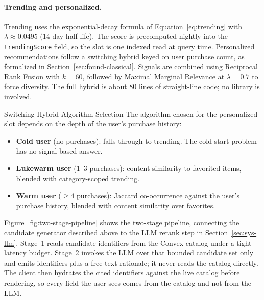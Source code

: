 \paragraph{Trending and personalized.} Trending uses the
exponential-decay formula of Equation~\ref{eq:trending} with
$\lambda \approx 0.0495$
(14-day half-life). The score is precomputed nightly into the
\texttt{trendingScore} field, so the slot is one indexed read at
query time. Personalized recommendations follow a switching
hybrid keyed on user purchase count, as formalized in
Section~\ref{sec:found-classical}. Signals are combined using
Reciprocal Rank Fusion with $k = 60$, followed by Maximal
Marginal Relevance at $\lambda = 0.7$ to force diversity. The
full hybrid is about 80 lines of straight-line code; no library
is involved.

\begin{calloutbox}{Switching-Hybrid Algorithm Selection}
  The algorithm chosen for the personalized slot depends on the
  depth of the user's purchase history:
  \begin{itemize}
    \item \textbf{Cold user} (no purchases): falls through to
      trending. The cold-start problem has no signal-based answer.
    \item \textbf{Lukewarm user} (1--3 purchases): content
      similarity to favorited items, blended with category-scoped
      trending.
    \item \textbf{Warm user} ($\ge 4$ purchases):
      Jaccard co-occurrence against the user's purchase history,
      blended with content similarity over favorites.
  \end{itemize}
\end{calloutbox}

Figure~\ref{fig:two-stage-pipeline} shows the two-stage pipeline,
connecting the candidate generator described above to the LLM
rerank step in Section~\ref{sec:sys-llm}. Stage~1 reads candidate
identifiers from the Convex catalog under a tight latency budget.
Stage~2 invokes the LLM over that bounded candidate set only and
emits identifiers plus a free-text rationale; it never reads
the catalog directly. The client then hydrates the cited
identifiers against the live catalog before rendering, so every
field the user sees comes from the catalog and not from the LLM.

